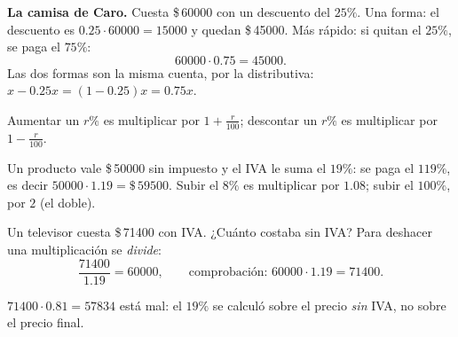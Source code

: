\documentclass[11pt,a4paper]{article}
\let\nivelzuka\nivel
\renewcommand{\nivel}[2]{\Needspace{8\baselineskip}\nivelzuka{#1}{#2}}
\newcommand{\pesos}[1]{\$\,\num{#1}}
\begin{document}

\begin{minipage}[c]{0.56\linewidth}
\textbf{La camisa de Caro.} Cuesta \pesos{60000} con un descuento del $25\%$. Una forma: el descuento es
$0.25\cdot\num{60000}=\num{15000}$ y quedan \pesos{45000}. Más rápido: si quitan el $25\%$, se paga el $75\%$:
\[ \num{60000}\cdot0.75=\num{45000}. \]
Las dos formas son la misma cuenta, por la distributiva: $x-0.25x=(1-0.25)x=0.75x$.
\end{minipage}\hfill
\begin{minipage}[c]{0.4\linewidth}\centering
{}
\end{minipage}

\begin{definicion}
Aumentar un $r\%$ es multiplicar por $1+\tfrac{r}{100}$; descontar un $r\%$ es multiplicar por $1-\tfrac{r}{100}$.
\end{definicion}
Un producto vale \pesos{50000} sin impuesto y el IVA le suma el $19\%$: se paga el $119\%$, es decir
$\num{50000}\cdot1.19=\pesos{59500}$. Subir el $8\%$ es multiplicar por $1.08$; subir el $100\%$, por $2$ (el doble).

\begin{ejemplo}
Un televisor cuesta \pesos{71400} con IVA. ¿Cuánto costaba sin IVA? Para deshacer una multiplicación se \emph{divide}:
\[ \frac{\num{71400}}{1.19}=\num{60000},\qquad\text{comprobación: } \num{60000}\cdot1.19=\num{71400}. \]
\end{ejemplo}
\begin{ojo}
$\num{71400}\cdot0.81=\num{57834}$ está mal: el $19\%$ se calculó sobre el precio \emph{sin} IVA, no sobre el precio final.
\end{ojo}
\end{document}

